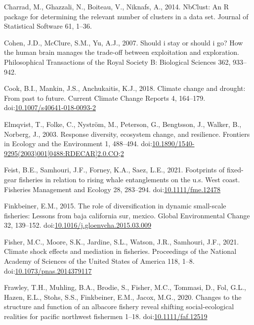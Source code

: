 \documentclass[]{elsarticle} %
\begin{document}
\leavevmode\hypertarget{ref-nbclust2014}{}%
Charrad, M., Ghazzali, N., Boiteau, V., Niknafs, A., 2014. NbClust: An R
package for determining the relevant number of clusters in a data set.
Journal of Statistical Software 61, 1--36.

\leavevmode\hypertarget{ref-Cohen2007}{}%
Cohen, J.D., McClure, S.M., Yu, A.J., 2007. Should i stay or should i
go? How the human brain manages the trade-off between exploitation and
exploration. Philosophical Transactions of the Royal Society B:
Biological Sciences 362, 933--942.

\leavevmode\hypertarget{ref-Cook2018}{}%
Cook, B.I., Mankin, J.S., Anchukaitis, K.J., 2018. Climate change and
drought: From past to future. Current Climate Change Reports 4,
164--179.
doi:\href{https://doi.org/10.1007/s40641-018-0093-2}{10.1007/s40641-018-0093-2}

\leavevmode\hypertarget{ref-Elmqvist2003a}{}%
Elmqvist, T., Folke, C., Nyström, M., Peterson, G., Bengtsson, J.,
Walker, B., Norberg, J., 2003. Response diversity, ecosystem change, and
resilience. Frontiers in Ecology and the Environment 1, 488--494.
doi:\href{https://doi.org/10.1890/1540-9295(2003)001\%5B0488:RDECAR\%5D2.0.CO;2}{10.1890/1540-9295(2003)001{[}0488:RDECAR{]}2.0.CO;2}

\leavevmode\hypertarget{ref-Feist2021}{}%
Feist, B.E., Samhouri, J.F., Forney, K.A., Saez, L.E., 2021. Footprints
of fixed-gear fisheries in relation to rising whale entanglements on the
u.s. West coast. Fisheries Management and Ecology 28, 283--294.
doi:\href{https://doi.org/10.1111/fme.12478}{10.1111/fme.12478}

\leavevmode\hypertarget{ref-Finkbeiner2015}{}%
Finkbeiner, E.M., 2015. The role of diversification in dynamic
small-scale fisheries: Lessons from baja california sur, mexico. Global
Environmental Change 32, 139--152.
doi:\href{https://doi.org/10.1016/j.gloenvcha.2015.03.009}{10.1016/j.gloenvcha.2015.03.009}

\leavevmode\hypertarget{ref-Fisher2021}{}%
Fisher, M.C., Moore, S.K., Jardine, S.L., Watson, J.R., Samhouri, J.F.,
2021. Climate shock effects and mediation in fisheries. Proceedings of
the National Academy of Sciences of the United States of America 118,
1--8.
doi:\href{https://doi.org/10.1073/pnas.2014379117}{10.1073/pnas.2014379117}

\leavevmode\hypertarget{ref-Frawley2020}{}%
Frawley, T.H., Muhling, B.A., Brodie, S., Fisher, M.C., Tommasi, D.,
Fol, G.L., Hazen, E.L., Stohs, S.S., Finkbeiner, E.M., Jacox, M.G.,
2020. Changes to the structure and function of an albacore fishery
reveal shifting social-ecological realities for pacific northwest
fishermen 1--18.
doi:\href{https://doi.org/10.1111/faf.12519}{10.1111/faf.12519}
\end{document}
